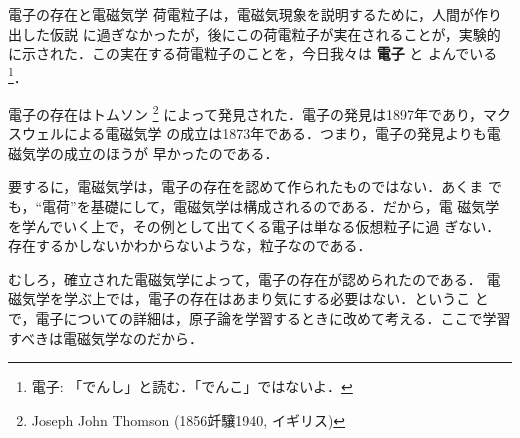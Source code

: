     \begin{memo}{電子の存在と電磁気学}
            荷電粒子は，電磁気現象を説明するために，人間が作り出した仮説
            に過ぎなかったが，後にこの荷電粒子が実在されることが，実験的
            に示された．この実在する荷電粒子のことを，今日我々は \textbf{電子} と
            よんでいる
                \footnote{
                    電子: 「でんし」と読む．「でんこ」ではないよ．
                }．

            電子の存在はトムソン
                \footnote{
                    Joseph John Thomson (1856竏驤1940, イギリス)
                }
            によって発見された．電子の発見は1897年であり，マクスウェルによる電磁気学
            の成立は1873年である．つまり，電子の発見よりも電磁気学の成立のほうが
            早かったのである．

            要するに，電磁気学は，電子の存在を認めて作られたものではない．あくま
            でも，“電荷”を基礎にして，電磁気学は構成されるのである．だから，電
            磁気学を学んでいく上で，その例として出てくる電子は単なる仮想粒子に過
            ぎない．存在するかしないかわからないような，粒子なのである．

            むしろ，確立された電磁気学によって，電子の存在が認められたのである．
            電磁気学を学ぶ上では，電子の存在はあまり気にする必要はない．というこ
            とで，電子についての詳細は，原子論を学習するときに改めて考える．ここで学習すべきは電磁気学なのだから．
        \end{memo}

